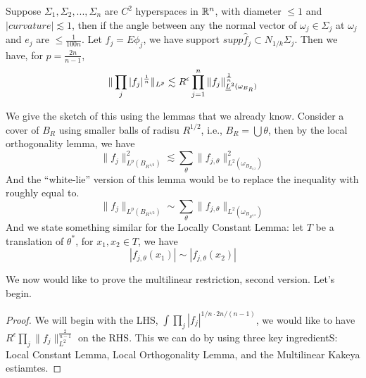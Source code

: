 \begin{theorem}
    Suppose $\Sigma_1, \Sigma_2, ..., \Sigma_n$ are $C^2$ hyperspaces in $\mathbb{R}^n$, with diameter $\leq 1$ and $|curvature|\lesssim 1$, then if the angle between any the normal vector of $\omega_j\in\Sigma_j$ at $\omega_j$ and $e_j$ are $\leq\frac{1}{100n}$. Let $f_j=E\phi_j$, we have support $supp\widehat{f}_j\subset N_{1/k}\Sigma_j$. Then we have, for $p=\frac{2n}{n-1}$, 
    \begin{equation*}
        \|\prod_j|f_j|^{\frac{1}{n}}\|_{L^p}\lesssim R^\epsilon\prod_{j=1}^n\|f_j\|_{\sout{L}^2(\omega_{B_R})}^{\frac{1}{n}}
    \end{equation*}
\end{theorem}
We give the sketch of this using the lemmas that we already know. Consider a cover of $B_R$ using smaller balls of radisu $R^{1/2}$, i.e., $B_R=\bigcup\theta$, then by the local orthogonality lemma, we have
\begin{equation*}
    \|f_j\|_{L^p(B_{R^{1/2}})}^2\lesssim \sum_{\theta}\|f_{j,\theta}\|_{L^2(\omega_{B_{R_{1/2}}})}^2
\end{equation*}
And the ``white-lie'' version of this lemma would be to replace the inequality with roughly equal to.
\begin{equation*}
    \|f_j\|_{L^p(B_{R^{1/2}})}\sim\sum_\theta\|f_{j,\theta}\|_{L^2(\omega_{B_{R^{1/2}}})}
\end{equation*}
And we state something similar for the Locally Constant Lemma: let $T$ be a translation of $\theta^*$, for $x_1,x_2\in T$, we have
\begin{equation*}
    |f_{j,\theta}(x_1)|\sim|f_{j,\theta}(x_2)|
\end{equation*}


We now would like to prove the multilinear restriction, second version. Let's begin.
\begin{proof}
    We will begin with the LHS, $\int\prod_j|f_j|^{1/n\cdot2n/(n-1)}$, we would like to have $R^\epsilon\prod_j\|f_j\|_{L^2}^{\frac{2}{n-1}}$ on the RHS.
    This we can do by using three key ingredientS: Local Constant Lemma, Local Orthogonality Lemma, and the Multilinear Kakeya estiamtes.

\end{proof}